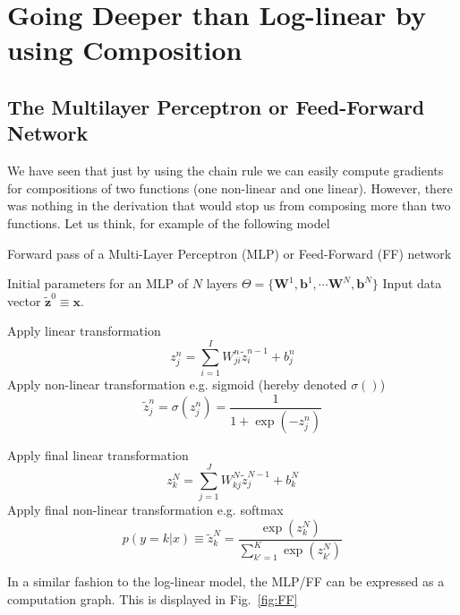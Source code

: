 \section{Going Deeper than Log-linear by using Composition}
\label{sec:deep_forward}

\subsection{The Multilayer Perceptron or Feed-Forward Network}

We have seen that just by using the chain rule we can easily compute gradients for
compositions of two functions (one non-linear and one linear). However, there
was nothing in the derivation that would stop us from composing more than two
functions. Let us think, for example of the following model

\begin{algorithm}[th!]
   \caption{Forward pass of a Multi-Layer Perceptron (MLP) or Feed-Forward (FF) network}
\begin{algorithmic}[1]
\label{algo:mlpforward}

    Initial parameters for an MLP of $N$ layers $\Theta=\{\mathbf{W}^1, \mathbf{b}^1, \cdots \mathbf{W}^N, \mathbf{b}^N\}$
    Input data vector $\mathbf{\tilde{z}}^{0}  \equiv \mathbf{x}$.

     \STATE Apply  linear transformation
        $$z_j^n = \sum_{i=1}^{I} W_{ji}^n \tilde{z}_i^{n-1} + b_j^n$$
     \STATE Apply non-linear transformation e.g. sigmoid (hereby denoted $\sigma()$)
     $$\tilde{z}_j^n = \sigma(z_j^n)  = \frac{1}{1+\exp(-z_j^n)}$$

	\ENDFOR

\STATE Apply final linear transformation
   $$z_k^N = \sum_{j=1}^{J} W_{kj}^N \tilde{z}_j^{N-1} + b_k^N$$
\STATE Apply final non-linear transformation e.g. softmax
$$p(y=k|{x}) \equiv \tilde{z}_k^N = \frac{\exp(z_k^N)}{\sum_{k'=1}^{K} \exp(z_{k'}^N)}$$

\end{algorithmic}
\end{algorithm}

\noindent In a similar fashion to the log-linear model, the MLP/FF can be expressed as a computation graph. This is displayed in Fig.~\ref{fig:FF}

